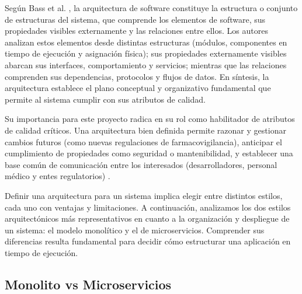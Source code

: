 Según Bass et al. \cite{bass2021}, la arquitectura de software constituye la estructura o conjunto de estructuras del sistema, que comprende los elementos de software, sus propiedades visibles externamente y las relaciones entre ellos.
Los autores analizan estos elementos desde distintas estructuras (módulos, componentes en tiempo de ejecución y asignación física); sus propiedades externamente visibles abarcan sus interfaces, comportamiento y servicios; mientras que las relaciones comprenden sus dependencias, protocolos y flujos de datos.
En síntesis, la arquitectura establece el plano conceptual y organizativo fundamental que permite al sistema cumplir con sus atributos de calidad.

Su importancia para este proyecto radica en su rol como habilitador de atributos de calidad críticos. 
Una arquitectura bien definida permite razonar y gestionar cambios futuros (como nuevas regulaciones de farmacovigilancia), anticipar el cumplimiento de propiedades como seguridad o mantenibilidad, y establecer una base común de comunicación entre los interesados (desarrolladores, personal médico y entes regulatorios) \cite{bass2021}.

Definir una arquitectura para un sistema implica elegir entre distintos estilos, cada uno con ventajas y limitaciones. 
A continuación, analizamos los dos estilos arquitectónicos más representativos en cuanto a la organización y despliegue de un sistema: el modelo monolítico y el de microservicios.
Comprender sus diferencias resulta fundamental para decidir cómo estructurar una aplicación en tiempo de ejecución.


\subsection{Monolito vs Microservicios}
\label{subsection: monolito_vs_microservicios}

